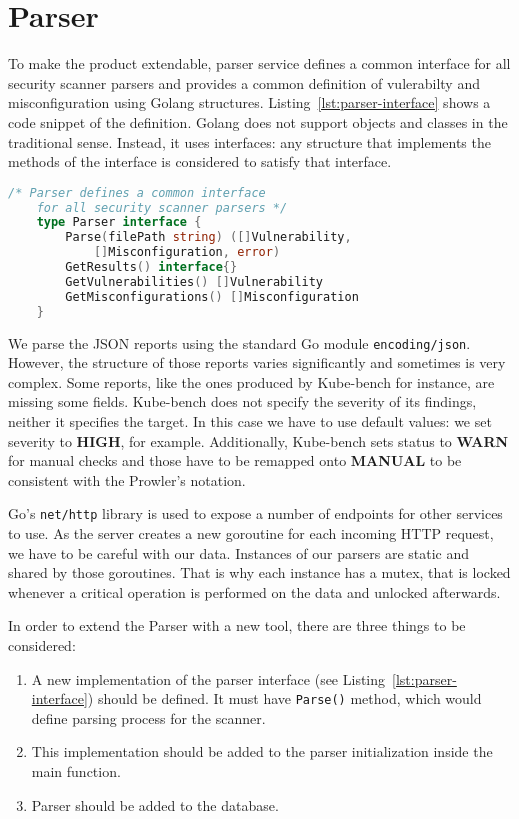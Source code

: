 \section{Parser}
\label{sec:parser}

To make the product extendable, parser service defines a common interface for all security scanner parsers and provides a common definition of vulerabilty and misconfiguration using Golang structures. Listing~\ref{lst:parser-interface} shows a code snippet of the definition. Golang does not support objects and classes in the traditional sense. Instead, it uses interfaces: any structure that implements the methods of the interface is considered to satisfy that interface.

\begin{lstlisting}[language=Go, caption={[A common interface for parsers] A common interface for parsers.}, label={lst:parser-interface}]
    /* Parser defines a common interface 
    for all security scanner parsers */
    type Parser interface {
        Parse(filePath string) ([]Vulnerability, 
            []Misconfiguration, error)
        GetResults() interface{}
        GetVulnerabilities() []Vulnerability
        GetMisconfigurations() []Misconfiguration
    }
\end{lstlisting}

We parse the JSON reports using the standard Go module \lstinline{encoding/json}. However, the structure of those reports varies significantly and sometimes is very complex. Some reports, like the ones produced by Kube-bench for instance, are missing some fields. Kube-bench does not specify the severity of its findings, neither it specifies the target. In this case we have to use default values: we set severity to \textbf{HIGH}, for example. Additionally, Kube-bench sets status to \textbf{WARN} for manual checks and those have to be remapped onto \textbf{MANUAL} to be consistent with the Prowler's notation.

Go's \lstinline{net/http} library is used to expose a number of endpoints for other services to use. As the server creates a new goroutine for each incoming HTTP request, we have to be careful with our data. Instances of our parsers are static and shared by those goroutines. That is why each instance has a mutex, that is locked whenever a critical operation is performed on the data and unlocked afterwards.

In order to extend the Parser with a new tool, there are three things to be considered:
\begin{enumerate}[noitemsep]
    \item A new implementation of the parser interface (see Listing~\ref{lst:parser-interface}) should be defined. It must have \lstinline{Parse()} method, which would define parsing process for the scanner.
    \item This implementation should be added to the parser initialization inside the main function.
    \item Parser should be added to the database.
\end{enumerate}
